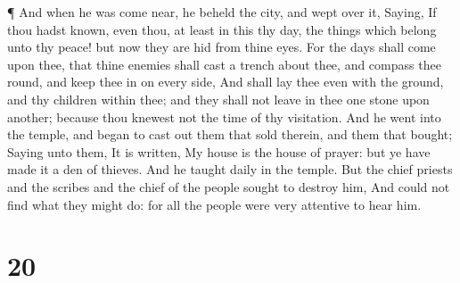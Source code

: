  ¶ And when he was come near, he beheld the city, and wept
over it,  Saying, If thou hadst known, even thou, at least
in this thy day, the things which belong unto thy peace! but now they
are hid from thine eyes.  For the days shall come upon
thee, that thine enemies shall cast a trench about thee, and compass
thee round, and keep thee in on every side,  And shall lay
thee even with the ground, and thy children within thee; and they shall
not leave in thee one stone upon another; because thou knewest not the
time of thy visitation.  And he went into the temple, and
began to cast out them that sold therein, and them that bought;
 Saying unto them, It is written, My house is the house of
prayer: but ye have made it a den of thieves.  And he
taught daily in the temple. But the chief priests and the scribes and
the chief of the people sought to destroy him,  And could
not find what they might do: for all the people were very attentive to
hear him.

\hypertarget{section-19}{%
\section{20}\label{section-19}}

